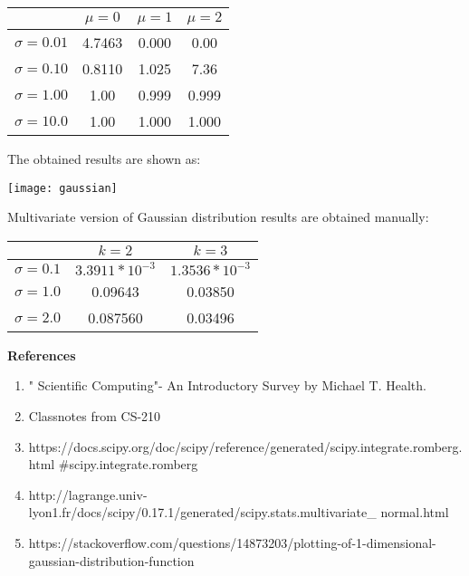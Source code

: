 \documentclass[12pt, oneside]{article}   	%
\begin{document}
\begin{enumerate}
		 \begin{center}
			\begin{tabular}{ c|c| c| c }
				&$\mu=0$ & $\mu=1$& $\mu=2$ \\ 
				\hline
				$\sigma= 0.01$ & 4.7463 & 0.000& 0.00\\  
				\hline
					$\sigma= 0.10$ & 0.8110 & 1.025 & 7.36 \\  
				\hline
					$\sigma= 1.00$ & 1.00 & 0.999 & 0.999 \\  
				\hline  
					$\sigma= 10.0$ & 1.00 &1.000 &1.000 \\  
				\hline  
			\end{tabular}
		\end{center}
	The obtained results are shown as:
	\begin{flushleft}
			\texttt{[image: gaussian]}
	\end{flushleft}

	Multivariate version of Gaussian distribution results are obtained manually:\\
	 \begin{center}
		\begin{tabular}{ c|c| c }
			&$k=2$ & $k=3$ \\ 
			\hline
			$\sigma= 0.1$ & $3.3911* 10^{-3}$& $1.3536 * 10^{-3}$\\  
			\hline
			$\sigma= 1.0$ & 0.09643 & 0.03850\\  
			\hline
			$\sigma= 2.0$ &  0.087560& 0.03496 \\  
			\hline  
		 
		\end{tabular}
	\end{center}

\end{enumerate}




\vspace{1cm}
\textbf{ \Large References}\\
\begin{enumerate}
	\item " Scientific Computing"- An Introductory Survey by Michael T. Health.
	\item Classnotes from CS-210
	\item https://docs.scipy.org/doc/scipy/reference/generated/scipy.integrate.romberg.html
	\#scipy.integrate.romberg
	\item http://lagrange.univ-lyon1.fr/docs/scipy/0.17.1/generated/scipy.stats.multivariate\_
	normal.html
	\item https://stackoverflow.com/questions/14873203/plotting-of-1-dimensional-gaussian-distribution-function
\end{enumerate}
\end{document}
